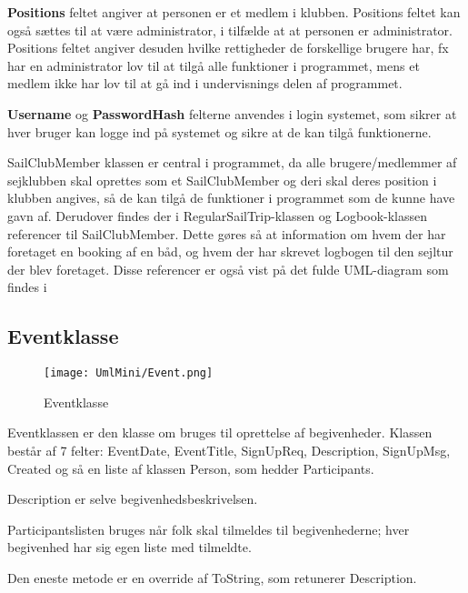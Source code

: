 \textbf{Positions} feltet angiver at personen er et medlem i klubben. 
Positions feltet kan også sættes til at være administrator, i tilfælde at at personen er administrator. 
Positions feltet angiver desuden hvilke rettigheder de forskellige brugere har, fx har en administrator lov til at tilgå alle funktioner i programmet, mens et medlem ikke har lov til at gå ind i undervisnings delen af programmet. 

\textbf{Username} og \textbf{PasswordHash} felterne anvendes i login systemet, som sikrer at hver bruger kan logge ind på systemet og sikre at de kan tilgå funktionerne.

SailClubMember klassen er central i programmet, da alle brugere/medlemmer af sejklubben skal oprettes som et SailClubMember og deri skal deres position i klubben angives, så de kan tilgå de funktioner i programmet som de kunne have gavn af. Derudover findes der i RegularSailTrip-klassen og Logbook-klassen referencer til SailClubMember. Dette gøres så at information om hvem der har foretaget en booking af en båd, og hvem der har skrevet logbogen til den sejltur der blev foretaget. Disse referencer er også vist på det fulde UML-diagram som findes i 
 
\subsection{Eventklasse}

\begin{wrapfigure}{l}{0.5\textwidth}
    \label{img:login_interface}
    \vspace{-20pt}
    \begin{center}
        \texttt{[image: UmlMini/Event.png]}
    \end{center}
    \vspace{-20pt}
    \caption{Eventklasse}
    \vspace{-10pt}
\end{wrapfigure}
Eventklassen er den klasse om bruges til oprettelse af  begivenheder. Klassen består af 7 felter: EventDate, EventTitle, SignUpReq, Description, SignUpMsg, Created og så en liste af klassen Person, som hedder Participants.

Description er selve begivenhedsbeskrivelsen. 

Participantslisten bruges når folk skal tilmeldes til begivenhederne; hver begivenhed har sig egen liste med tilmeldte. 

Den eneste metode er en override af ToString, som retunerer Description.

